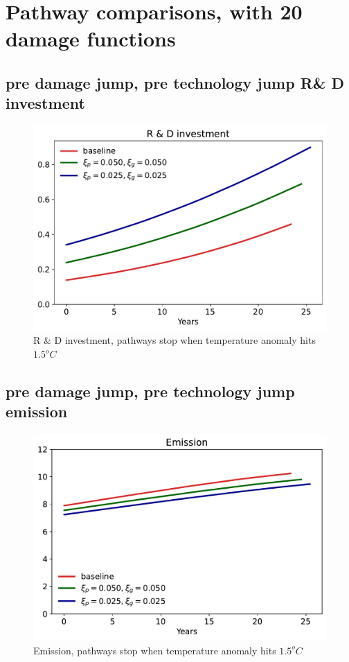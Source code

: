 \documentclass[11pt]{article}
\begin{document}
\section{Pathway comparisons, with 20 damage functions}

\subsection{pre damage jump, pre technology jump R\& D investment}
\begin{figure}[H]
	\centering
	\includegraphics[width=\textwidth]{../figures/20damage/Xt_1p5.pdf}
	\caption{R \& D investment, pathways stop when temperature anomaly hits $1.5^o C$}
\end{figure}

\subsection{pre damage jump, pre technology jump emission}
\begin{figure}[H]
	\centering
	\includegraphics[width=\textwidth]{../figures/20damage/Et_1p5.pdf}
	\caption{Emission, pathways stop when temperature anomaly hits $1.5^o C$}
\end{figure}
\end{document}
